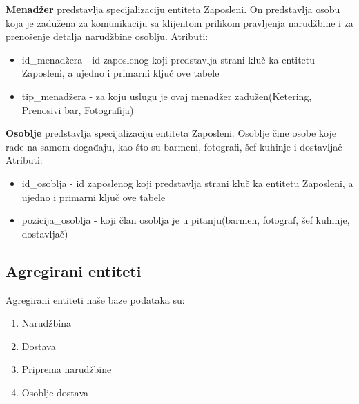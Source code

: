 \documentclass[a4paper]{article}
\begin{document}
\vspace{3mm}

\textbf{Menadžer} predstavlja specijalizaciju entiteta Zaposleni. On predstavlja osobu koja je zadužena za komunikaciju sa klijentom prilikom pravljenja narudžbine i za prenošenje detalja narudžbine osoblju. Atributi:
\begin{itemize}
    \item id\_menadžera - id zaposlenog koji predstavlja strani kluč ka entitetu Zaposleni, a ujedno i primarni ključ ove tabele
    \item tip\_menadžera - za koju uslugu je ovaj menadžer zadužen(Ketering, Prenosivi bar, Fotografija) 
\end{itemize}

\vspace{3mm}

\textbf{Osoblje} predstavlja specijalizaciju entiteta Zaposleni. Osoblje čine osobe koje rade na samom događaju, kao što su barmeni, fotografi, šef kuhinje i dostavljač Atributi:
\begin{itemize}
    \item id\_osoblja - id zaposlenog koji predstavlja strani kluč ka entitetu Zaposleni, a ujedno i primarni ključ ove tabele
    \item pozicija\_osoblja - koji član osoblja je u pitanju(barmen, fotograf, šef kuhinje, dostavljač) 
\end{itemize}


\vspace{3mm}

\subsection{Agregirani entiteti}

Agregirani entiteti naše baze podataka su:
\begin{enumerate}
    \item Narudžbina
    \item Dostava
    \item Priprema narudžbine
    \item Osoblje dostava
\end{enumerate}


\vspace{3mm}
\end{document}
